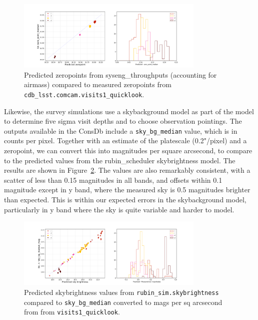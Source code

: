 \begin{figure}
    \centering
    \includegraphics[width=0.8\textwidth]{sp/zeropoints.png}
    \caption{Predicted zeropoints from syseng\_throughputs (accounting for airmass) compared to measured zeropoints from \texttt{cdb\_lsst.comcam.visits1\_quicklook}.}
    \label{fig:zeropoints}
    \end{figure}
    
    
    
Likewise, the survey simulations use a skybackground model as part of the model to determine five sigma visit depths and to choose observation pointings. The outputs available in the ConsDb include a \texttt{sky\_bg\_median} value, which is in counts per pixel. Together with an estimate of the platescale (0.2"/pixel) and a zeropoint, we can convert this into magnitudes per square arcsecond, to compare to the predicted values from the rubin\_scheduler skybrightness model. The results are shown in Figure~\ref{fig:sky}.  The values are also remarkably consistent, with a scatter of less than 0.15 magnitudes in all bands, and offsets within 0.1 magnitude except in y band, where the measured sky is 0.5 magnitudes brighter than expected. This is  within our expected errors in the skybackground model, particularly in y band where the sky is quite variable and harder to model. 

\begin{figure}
    \centering
    \includegraphics[width=0.8\textwidth]{sp/sky.png}
    \caption{Predicted skybrightness values from \texttt{rubin\_sim.skybrightness} compared to
      \texttt{sky\_bg\_median} converted to mags per sq arcsecond  from  from \texttt{visits1\_quicklook}.}
    \label{fig:sky}
    \end{figure}
    
